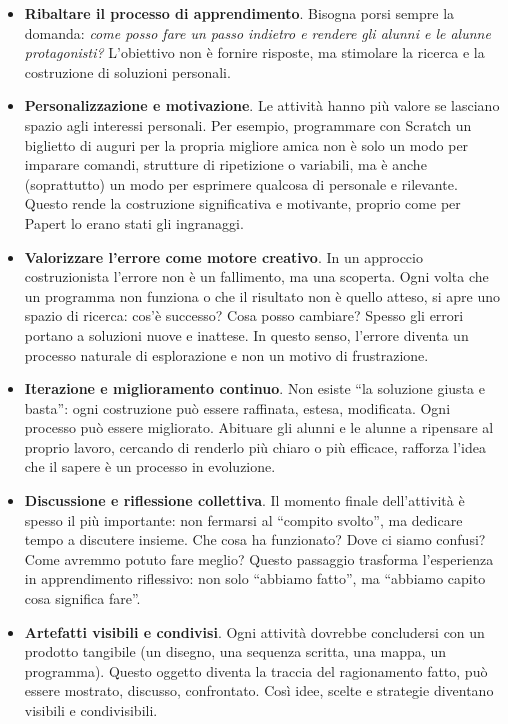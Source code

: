 \begin{itemize}
\item
  \textbf{Ribaltare il processo di apprendimento}. Bisogna porsi sempre la domanda: \textit{come posso fare un passo indietro e rendere gli alunni e le alunne protagonisti?} L'obiettivo non è fornire risposte, ma stimolare la ricerca e la costruzione di soluzioni personali.

\item
  \textbf{Personalizzazione e motivazione}. Le attività hanno più valore se lasciano spazio agli interessi personali. Per esempio, programmare con Scratch un biglietto di auguri per la propria migliore amica non è solo un modo per imparare comandi, strutture di ripetizione o variabili, ma è anche (soprattutto) un modo per esprimere qualcosa di personale e rilevante. Questo rende la costruzione significativa e motivante, proprio come per Papert lo erano stati gli ingranaggi.

\item
  \textbf{Valorizzare l'errore come motore creativo}. In un approccio costruzionista l'errore non è un fallimento, ma una scoperta. Ogni volta che un programma non funziona o che il risultato non è quello atteso, si apre uno spazio di ricerca: cos'è successo? Cosa posso cambiare? Spesso gli errori portano a soluzioni nuove e inattese. In questo senso, l'errore diventa un processo naturale di esplorazione e non un motivo di frustrazione.

\item
  \textbf{Iterazione e miglioramento continuo}. Non esiste ``la soluzione giusta e basta'': ogni costruzione può essere raffinata, estesa, modificata. Ogni processo può essere migliorato. Abituare gli alunni e le alunne a ripensare al proprio lavoro, cercando di renderlo più chiaro o più efficace, rafforza l'idea che il sapere è un processo in evoluzione.

\item
  \textbf{Discussione e riflessione collettiva}. Il momento finale dell'attività è spesso il più importante: non fermarsi al ``compito svolto'', ma dedicare tempo a discutere insieme. Che cosa ha funzionato? Dove ci siamo confusi? Come avremmo potuto fare meglio? Questo passaggio trasforma l'esperienza in apprendimento riflessivo: non solo ``abbiamo fatto'', ma ``abbiamo capito cosa significa fare''.

\item
  \textbf{Artefatti visibili e condivisi}. Ogni attività dovrebbe concludersi con un prodotto tangibile (un disegno, una sequenza scritta, una mappa, un programma). Questo oggetto diventa la traccia del ragionamento fatto, può essere mostrato, discusso, confrontato. Così idee, scelte e strategie diventano visibili e condivisibili.


\end{itemize}
